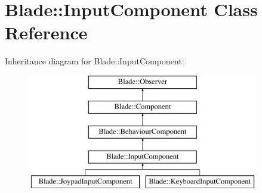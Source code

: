 \hypertarget{class_blade_1_1_input_component}{}\section{Blade\+:\+:Input\+Component Class Reference}
\label{class_blade_1_1_input_component}
Inheritance diagram for Blade\+:\+:Input\+Component\+:\begin{figure}[H]
\begin{center}
\leavevmode
\includegraphics[height=5.000000cm]{class_blade_1_1_input_component}
\end{center}
\end{figure}
